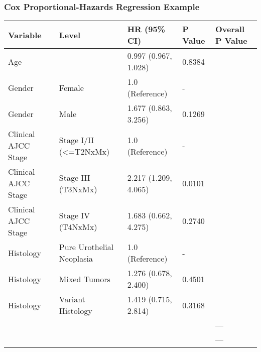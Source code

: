 \documentclass[table]{article}
\newenvironment{Shaded}{\begin{snugshade}}{\end{snugshade}}
\newcommand{\CommentTok}[1]{\textcolor[rgb]{0.56,0.35,0.01}{\textit{#1}}}
\newcommand{\DataTypeTok}[1]{\textcolor[rgb]{0.13,0.29,0.53}{#1}}
\newcommand{\KeywordTok}[1]{\textcolor[rgb]{0.13,0.29,0.53}{\textbf{#1}}}
\newcommand{\NormalTok}[1]{#1}
\newcommand{\OperatorTok}[1]{\textcolor[rgb]{0.81,0.36,0.00}{\textbf{#1}}}
\newcommand{\StringTok}[1]{\textcolor[rgb]{0.31,0.60,0.02}{#1}}
\begin{document}
\clearpage

\hypertarget{cox-proportional-hazards-regression-example}{%
\subsubsection{Cox Proportional-Hazards Regression
Example}\label{cox-proportional-hazards-regression-example}}

\begin{Shaded}
\end{Shaded}

\begin{tabular}{l|l|l|l|l}
\hline
Variable & Level & HR (95\% CI) & P Value & Overall P Value\\
\hline
Age &  & 0.997 (0.967, 1.028) & 0.8384 & \\
\hline
Gender & Female & 1.0 (Reference) & - & \\
\hline
Gender & Male & 1.677 (0.863, 3.256) & 0.1269 & \\
\hline
Clinical AJCC Stage & Stage I/II (<=T2NxMx) & 1.0 (Reference) & - & \\
\hline
Clinical AJCC Stage & Stage III (T3NxMx) & 2.217 (1.209, 4.065) & 0.0101 & \\
\hline
Clinical AJCC Stage & Stage IV (T4NxMx) & 1.683 (0.662, 4.275) & 0.2740 & \\
\hline
Histology & Pure Urothelial Neoplasia & 1.0 (Reference) & - & \\
\hline
Histology & Mixed Tumors & 1.276 (0.678, 2.400) & 0.4501 & \\
\hline
Histology & Variant Histology & 1.419 (0.715, 2.814) & 0.3168 & \\
\hline
 &  &  &  & ---\\
\hline
 &  &  &  & ---\\
\hline
\end{tabular}
\end{document}
